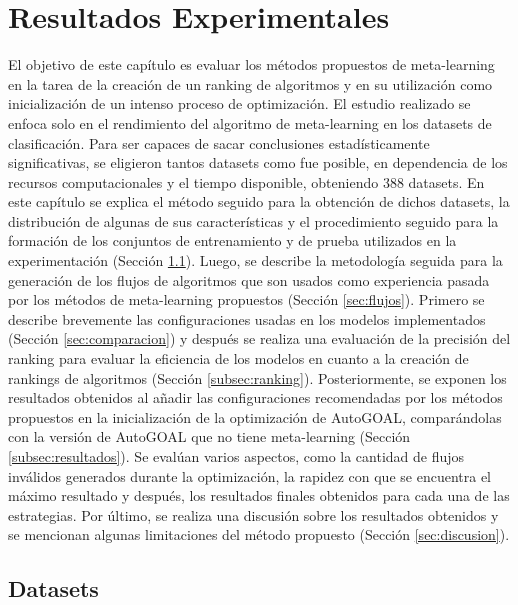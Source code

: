 \chapter{Resultados Experimentales}\label{chapter:results}

El objetivo de este capítulo es evaluar los métodos propuestos de meta-learning en la tarea de la creación de un ranking de algoritmos y en su utilización como inicialización de un intenso proceso de optimización. El estudio realizado se enfoca solo en el rendimiento del algoritmo de meta-learning en los datasets de clasificación. Para ser capaces de sacar conclusiones estadísticamente significativas, se eligieron tantos datasets como fue posible, en dependencia de los recursos computacionales y el tiempo disponible, obteniendo 388 datasets. En este capítulo se explica el método seguido para la obtención de dichos datasets, la distribución de algunas de sus características y el procedimiento seguido para la formación de los conjuntos de entrenamiento y de prueba utilizados en la experimentación (Sección \ref{sec:datasets}). Luego, se describe la metodología seguida para la generación de los flujos de algoritmos que son usados como experiencia pasada por los métodos de meta-learning propuestos (Sección \ref{sec:flujos}). Primero se describe brevemente las configuraciones usadas en los modelos implementados (Sección \ref{sec:comparacion}) y después se realiza una evaluación de la precisión del ranking para evaluar la eficiencia de los modelos en cuanto a la creación de rankings de algoritmos (Sección \ref{subsec:ranking}). Posteriormente, se exponen los resultados obtenidos al añadir las configuraciones recomendadas por los métodos propuestos en la inicialización de la optimización de AutoGOAL, comparándolas con la versión de AutoGOAL que no tiene meta-learning (Sección \ref{subsec:resultados}). Se evalúan varios aspectos, como la cantidad de flujos inválidos generados durante la optimización, la rapidez con que se encuentra el máximo resultado y después, los resultados finales obtenidos para cada una de las estrategias. Por último, se realiza una discusión sobre los resultados obtenidos y se mencionan algunas limitaciones del método propuesto (Sección \ref{sec:discusion}).


\section{Datasets}\label{sec:datasets}

%
%
%

